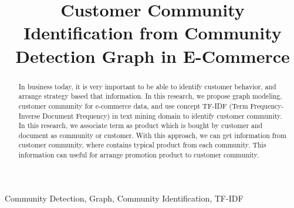 \documentclass[conference]{IEEEtran}
\begin{document}
%
\title{Customer Community Identification from Community Detection Graph in E-Commerce}


\author{
\and
{}
}

\maketitle


\begin{abstract}
In business today, it is very important to be able to identify customer behavior, and arrange strategy based that information. In this research, we propose graph modeling, customer community for e-commerce data, and use concept TF-IDF (Term Frequency-Inverse Document Frequency) in text mining domain to identify customer community. In this research, we associate term as product which is bought by customer and document as community or customer. With this approach, we can get information from customer community, where contains typical product from each community. This information can useful for arrange promotion product to customer community.
\end{abstract}

\begin{IEEEkeywords}
Community Detection, Graph, Community Identification, TF-IDF
\end{IEEEkeywords}
\end{document}
